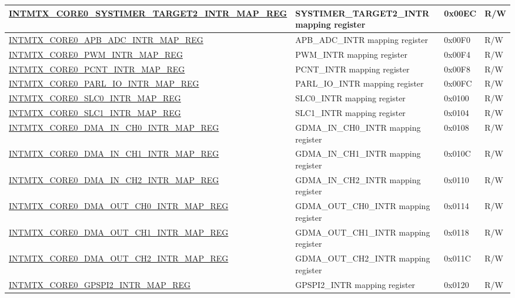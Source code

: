 \begin{longtable}{ | p{10cm} | p{10cm} | p{1.3cm} | p{1cm} | }
\hyperref[regdesc:INTMTXCORE0SYSTIMERTARGET2INTRMAPREG]{INTMTX\_CORE0\_SYSTIMER\_TARGET2\_INTR\_MAP\_REG} & SYSTIMER\_TARGET2\_INTR mapping register & 0x00EC & R/W \\ \hline
\hyperref[regdesc:INTMTXCORE0APBADCINTRMAPREG]{INTMTX\_CORE0\_APB\_ADC\_INTR\_MAP\_REG} & APB\_ADC\_INTR mapping register & 0x00F0 & R/W \\ \hline
\hyperref[regdesc:INTMTXCORE0PWMINTRMAPREG]{INTMTX\_CORE0\_PWM\_INTR\_MAP\_REG} & PWM\_INTR mapping register & 0x00F4 & R/W \\ \hline
\hyperref[regdesc:INTMTXCORE0PCNTINTRMAPREG]{INTMTX\_CORE0\_PCNT\_INTR\_MAP\_REG} & PCNT\_INTR mapping register & 0x00F8 & R/W \\ \hline
\hyperref[regdesc:INTMTXCORE0PARLIOINTRMAPREG]{INTMTX\_CORE0\_PARL\_IO\_INTR\_MAP\_REG} & PARL\_IO\_INTR mapping register & 0x00FC & R/W \\ \hline
\hyperref[regdesc:INTMTXCORE0SLC0INTRMAPREG]{INTMTX\_CORE0\_SLC0\_INTR\_MAP\_REG} & SLC0\_INTR mapping register & 0x0100 & R/W \\ \hline
\hyperref[regdesc:INTMTXCORE0SLC1INTRMAPREG]{INTMTX\_CORE0\_SLC1\_INTR\_MAP\_REG} & SLC1\_INTR mapping register & 0x0104 & R/W \\ \hline
\hyperref[regdesc:INTMTXCORE0DMAINCH0INTRMAPREG]{INTMTX\_CORE0\_DMA\_IN\_CH0\_INTR\_MAP\_REG} & GDMA\_IN\_CH0\_INTR mapping register & 0x0108 & R/W \\ \hline
\hyperref[regdesc:INTMTXCORE0DMAINCH1INTRMAPREG]{INTMTX\_CORE0\_DMA\_IN\_CH1\_INTR\_MAP\_REG} & GDMA\_IN\_CH1\_INTR mapping register & 0x010C & R/W \\ \hline
\hyperref[regdesc:INTMTXCORE0DMAINCH2INTRMAPREG]{INTMTX\_CORE0\_DMA\_IN\_CH2\_INTR\_MAP\_REG} & GDMA\_IN\_CH2\_INTR mapping register & 0x0110 & R/W \\ \hline
\hyperref[regdesc:INTMTXCORE0DMAOUTCH0INTRMAPREG]{INTMTX\_CORE0\_DMA\_OUT\_CH0\_INTR\_MAP\_REG} & GDMA\_OUT\_CH0\_INTR mapping register & 0x0114 & R/W \\ \hline
\hyperref[regdesc:INTMTXCORE0DMAOUTCH1INTRMAPREG]{INTMTX\_CORE0\_DMA\_OUT\_CH1\_INTR\_MAP\_REG} & GDMA\_OUT\_CH1\_INTR mapping register & 0x0118 & R/W \\ \hline
\hyperref[regdesc:INTMTXCORE0DMAOUTCH2INTRMAPREG]{INTMTX\_CORE0\_DMA\_OUT\_CH2\_INTR\_MAP\_REG} & GDMA\_OUT\_CH2\_INTR mapping register & 0x011C & R/W \\ \hline
\hyperref[regdesc:INTMTXCORE0GPSPI2INTRMAPREG]{INTMTX\_CORE0\_GPSPI2\_INTR\_MAP\_REG} & GPSPI2\_INTR mapping register & 0x0120 & R/W \\ \hline

\end{longtable}
